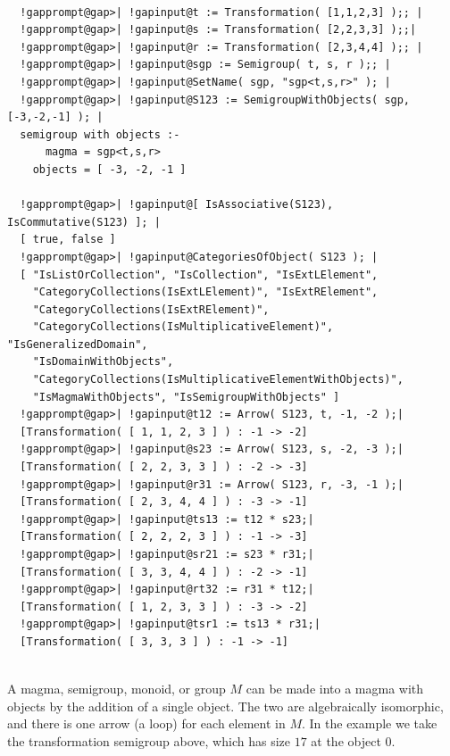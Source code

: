 \documentclass[a4paper,11pt]{report}
\begin{document}
{{{ 

 }

 
\begin{Verbatim}[commandchars=!@|,fontsize=\small,frame=single,label=Example]
  
  !gapprompt@gap>| !gapinput@t := Transformation( [1,1,2,3] );; |
  !gapprompt@gap>| !gapinput@s := Transformation( [2,2,3,3] );;|
  !gapprompt@gap>| !gapinput@r := Transformation( [2,3,4,4] );; |
  !gapprompt@gap>| !gapinput@sgp := Semigroup( t, s, r );; |
  !gapprompt@gap>| !gapinput@SetName( sgp, "sgp<t,s,r>" ); |
  !gapprompt@gap>| !gapinput@S123 := SemigroupWithObjects( sgp, [-3,-2,-1] ); |
  semigroup with objects :-
      magma = sgp<t,s,r>
    objects = [ -3, -2, -1 ]
  
  !gapprompt@gap>| !gapinput@[ IsAssociative(S123), IsCommutative(S123) ]; |
  [ true, false ]
  !gapprompt@gap>| !gapinput@CategoriesOfObject( S123 ); |
  [ "IsListOrCollection", "IsCollection", "IsExtLElement", 
    "CategoryCollections(IsExtLElement)", "IsExtRElement", 
    "CategoryCollections(IsExtRElement)", 
    "CategoryCollections(IsMultiplicativeElement)", "IsGeneralizedDomain", 
    "IsDomainWithObjects", 
    "CategoryCollections(IsMultiplicativeElementWithObjects)", 
    "IsMagmaWithObjects", "IsSemigroupWithObjects" ]
  !gapprompt@gap>| !gapinput@t12 := Arrow( S123, t, -1, -2 );|
  [Transformation( [ 1, 1, 2, 3 ] ) : -1 -> -2]
  !gapprompt@gap>| !gapinput@s23 := Arrow( S123, s, -2, -3 );|
  [Transformation( [ 2, 2, 3, 3 ] ) : -2 -> -3]
  !gapprompt@gap>| !gapinput@r31 := Arrow( S123, r, -3, -1 );|
  [Transformation( [ 2, 3, 4, 4 ] ) : -3 -> -1]
  !gapprompt@gap>| !gapinput@ts13 := t12 * s23;|
  [Transformation( [ 2, 2, 2, 3 ] ) : -1 -> -3]
  !gapprompt@gap>| !gapinput@sr21 := s23 * r31;|
  [Transformation( [ 3, 3, 4, 4 ] ) : -2 -> -1]
  !gapprompt@gap>| !gapinput@rt32 := r31 * t12;|
  [Transformation( [ 1, 2, 3, 3 ] ) : -3 -> -2]
  !gapprompt@gap>| !gapinput@tsr1 := ts13 * r31;|
  [Transformation( [ 3, 3, 3 ] ) : -1 -> -1]
  
\end{Verbatim}
 A magma, semigroup, monoid, or group $M$ can be made into a magma with objects by the addition of a single object. The
two are algebraically isomorphic, and there is one arrow (a loop) for each
element in $M$. In the example we take the transformation semigroup above, which has size $17$ at the object $0$. 

 

 
\begin{Verbatim}[commandchars=!@|,fontsize=\small,frame=single,label=Example]
  

\end{Verbatim}}}
\end{document}
